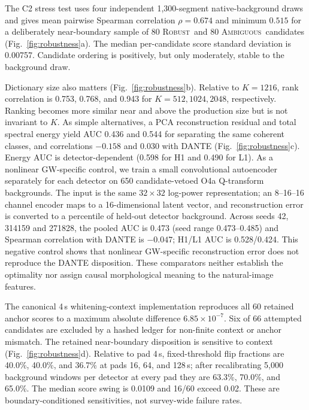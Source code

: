 \documentclass[12pt]{article}
\newcommand{\robust}{\textsc{Robust}}
\newcommand{\ambiguous}{\textsc{Ambiguous}}
\begin{document}
The C2 stress test uses four independent 1,300-segment native-background draws
and gives mean pairwise
Spearman correlation $\rho=0.674$ and minimum $0.515$ for a deliberately
near-boundary sample of 80 \robust\ and 80 \ambiguous\ candidates
(Fig.~\ref{fig:robustness}a).  The median per-candidate score standard
deviation is 0.00757. Candidate ordering is positively, but only moderately,
stable to the background draw.

Dictionary size also matters (Fig.~\ref{fig:robustness}b).  Relative to
$K=1216$, rank correlation is 0.753, 0.768, and 0.943 for
$K=512,1024,2048$, respectively.  Ranking becomes more similar near and above
the production size but is not invariant to $K$.  As simple alternatives, a
PCA reconstruction residual and total spectral energy yield AUC 0.436 and
0.544 for separating the same coherent classes, and correlations $-0.158$ and
$0.030$ with DANTE (Fig.~\ref{fig:robustness}c). Energy AUC is
detector-dependent (0.598 for H1 and 0.490 for L1).  As a nonlinear
GW-specific control, we train a small convolutional autoencoder separately for
each detector on 650 candidate-vetoed O4a Q-transform backgrounds.  The input
is the same $32\times32$ log-power representation; an 8--16--16 channel encoder
maps to a 16-dimensional latent vector, and reconstruction error is converted
to a percentile of held-out detector background.  Across seeds 42, 314159 and
271828, the pooled AUC is 0.473 (seed range 0.473--0.485) and Spearman
correlation with DANTE is $-0.047$; H1/L1 AUC is 0.528/0.424.  This negative
control shows that nonlinear GW-specific reconstruction error does not
reproduce the DANTE disposition.  These comparators neither establish the
optimality nor assign causal morphological meaning to the natural-image
features.

The canonical 4\,s whitening-context implementation reproduces all 60 retained
anchor scores to a maximum absolute difference $6.85\times10^{-7}$.  Six of
66 attempted candidates are excluded by a hashed ledger for non-finite context
or anchor mismatch.  The retained near-boundary disposition is sensitive to
context (Fig.~\ref{fig:robustness}d).  Relative to pad 4\,s, fixed-threshold
flip fractions are 40.0\%, 40.0\%, and 36.7\% at pads 16, 64, and 128\,s;
after recalibrating 5,000 background windows per detector at every pad they are
63.3\%, 70.0\%, and 65.0\%. The median score swing is 0.0109 and 16/60 exceed
0.02. These are boundary-conditioned sensitivities, not
survey-wide failure rates.
\end{document}
